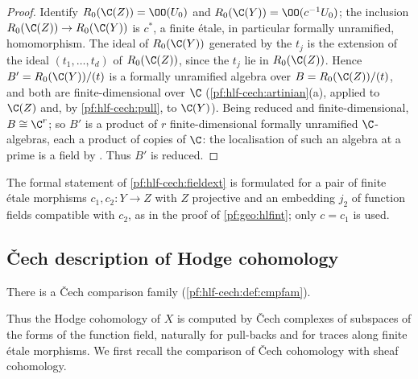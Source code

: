\begin{proof}
Identify $R_0(\C(Z))=\OO(U_0)$ and $R_0(\C(Y))=\OO(c^{-1}U_0)$; the inclusion $R_0(\C(Z))\to R_0(\C(Y))$ is $c^*$, a finite \'etale, in particular
formally unramified, homomorphism. The ideal of $R_0(\C(Y))$ generated by the $t_j$ is the extension of the ideal
$(t_1,\dots,t_d)$ of $R_0(\C(Z))$, since the $t_j$ lie in $R_0(\C(Z))$. Hence $B'=R_0(\C(Y))/(t)$ is a formally unramified algebra over
$B=R_0(\C(Z))/(t)$, and both are finite-dimensional over $\C$ (\cref{pf:hlf-cech:artinian}(a), applied to $\C(Z)$ and, by \cref{pf:hlf-cech:pull},
to $\C(Y)$). Being reduced and finite-dimensional, $B\cong\C^r$; so $B'$ is a product of $r$ finite-dimensional formally unramified
$\C$-algebras, each a product of copies of $\C$: the localisation of such an algebra at a prime is a field by \cite[Tag~00UW]{Stacks2024}. Thus $B'$ is reduced.
\end{proof}

\begin{remark}\label{pf:hlf-cech:rem:fieldext}
The formal statement of \cref{pf:hlf-cech:fieldext} is formulated for a pair of finite \'etale morphisms $c_1,c_2\colon Y\to Z$ with $Z$ projective and
an embedding $j_2$ of function fields compatible with $c_2$, as in the proof of \cref{pf:geo:hlfint}; only $c=c_1$ is used.
\end{remark}

\subsection{\v{C}ech description of Hodge cohomology}\label{sec:pf:hlf-cech:cech}

\begin{theorem}\label{pf:hlf-cech:cechthm}
There is a \v{C}ech comparison family (\cref{pf:hlf-cech:def:cmpfam}).
\end{theorem}

Thus the Hodge cohomology of $X$ is computed by \v{C}ech complexes of subspaces of the forms of the function field, naturally for
pull-backs and for traces along finite \'etale morphisms. We first recall the comparison of \v{C}ech cohomology with sheaf cohomology.

